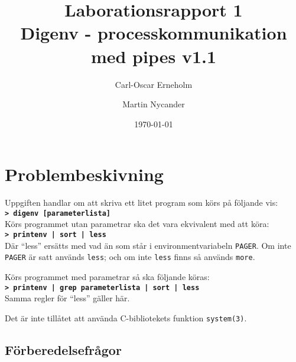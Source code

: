\documentclass[a4paper,10pt]{article}
\title{Laborationsrapport 1 \\ Digenv - processkommunikation med pipes v1.1}
\author{Carl-Oscar Erneholm \and Martin Nycander}
\date{\today}
\newcommand{\cmdline}[1]{\mbox{\textbf{\texttt{> #1}}}}
\begin{document}


\maketitle

\section{Problembeskivning}

Uppgiften handlar om att skriva ett litet program som körs på följande vis: \\
\cmdline{digenv [parameterlista]} \\
Körs programmet utan parametrar ska det vara ekvivalent med att köra: \\
\cmdline{printenv | sort | less} \\
Där ``less'' ersätts med vad än som står i environmentvariabeln \verb!PAGER!. Om inte \verb!PAGER! är satt används \verb!less!; och om inte \verb!less! finns så används \verb!more!.

Körs programmet med parametrar så ska följande köras: \\
\cmdline{printenv | grep parameterlista | sort | less} \\
Samma regler för ``less'' gäller här.

Det är inte tillåtet att använda C-bibliotekets funktion \verb!system(3)!.

\subsection{Förberedelsefrågor}
\end{document}
